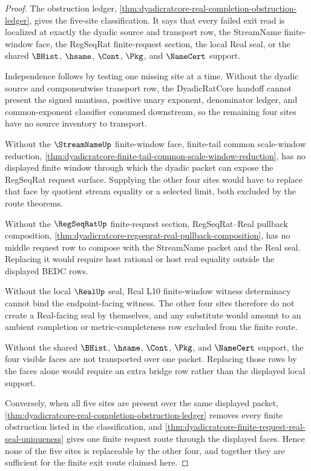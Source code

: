 \begin{proof}
The obstruction ledger, \autoref{thm:dyadicratcore-real-completion-obstruction-ledger}, gives the five-site classification. It says that every failed exit read is localized at exactly the dyadic source and transport row, the StreamName finite-window face, the RegSeqRat finite-request section, the local Real seal, or the shared $\BHist$, $\hsame$, $\Cont$, $\Pkg$, and $\NameCert$ support.

Independence follows by testing one missing site at a time. Without the dyadic source and componentwise transport row, the DyadicRatCore handoff cannot present the signed mantissa, positive unary exponent, denominator ledger, and common-exponent classifier consumed downstream, so the remaining four sites have no source inventory to transport.

Without the $\StreamNameUp$ finite-window face, finite-tail common scale-window reduction, \autoref{thm:dyadicratcore-finite-tail-common-scale-window-reduction}, has no displayed finite window through which the dyadic packet can expose the RegSeqRat request surface. Supplying the other four sites would have to replace that face by quotient stream equality or a selected limit, both excluded by the route theorems.

Without the $\RegSeqRatUp$ finite-request section, RegSeqRat--Real pullback composition, \autoref{thm:dyadicratcore-regseqrat-real-pullback-composition}, has no middle request row to compose with the StreamName packet and the Real seal. Replacing it would require host rational or host real equality outside the displayed BEDC rows.

Without the local $\RealUp$ seal, Real L10 finite-window witness determinacy cannot bind the endpoint-facing witness. The other four sites therefore do not create a Real-facing seal by themselves, and any substitute would amount to an ambient completion or metric-completeness row excluded from the finite route.

Without the shared $\BHist$, $\hsame$, $\Cont$, $\Pkg$, and $\NameCert$ support, the four visible faces are not transported over one packet. Replacing those rows by the faces alone would require an extra bridge row rather than the displayed local support.

Conversely, when all five sites are present over the same displayed packet, \autoref{thm:dyadicratcore-real-completion-obstruction-ledger} removes every finite obstruction listed in the classification, and \autoref{thm:dyadicratcore-finite-request-real-seal-uniqueness} gives one finite request route through the displayed faces. Hence none of the five sites is replaceable by the other four, and together they are sufficient for the finite exit route claimed here.
\end{proof}

